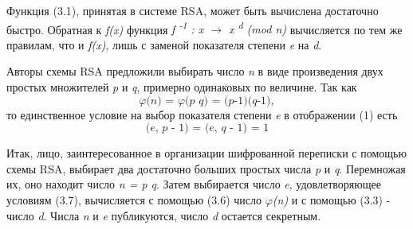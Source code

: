   Функция (3.1), принятая в системе RSA, может быть вычислена достаточно быстро. Обратная к \textit{f(x)} функция 
\textit{f\textsuperscript{ -1} : x {$\rightarrow$} x\textsuperscript{ d} (mod n) } вычисляется по тем же правилам, что и \textit{f(x)}, 
лишь с заменой показателя степени \textit{e} на \textit{d}.
\begin{comment}
  Для вычисления функции (3.1) достаточно знать лишь числа \textit{e} и \textit{n}. Именно они составляют открытый ключ для шифрования. 
А вот для вычисления обратной функции требуется знать число \textit{d}. Казалось бы, ничего не стоит, зная число \textit{n}, разложить 
его на простые сомножители, вычислить затем с помощью известных правил значение \textit{{$\varphi$}(n)} и, наконец, с помощью (3.3) определить 
нужное число \textit{d}. Все шаги этого вычисления могут быть реализованы достаточно быстро, за исключением первого. Именно разложение числа \textit{n} на 
простые множители и составляет наиболее трудоемкую часть вычислений. В теории чисел несмотря на многолетнюю её историю и на очень интенсивные поиски в течение последних 20 лет, 
эффективный алгоритм разложения натуральных чисел на множители так и не найден.
\end{comment}
  Авторы схемы RSA предложили выбирать число \textit{n} в виде произведения двух простых множителей \textit{p} и \textit{q}, примерно одинаковых по 
величине. Так как 
\begin{equation}
 \textit{{$\varphi$}(n) = {$\varphi$}(p q) = (p-1)(q-1)},
\end{equation}
то единственное условие на выбор показателя степени \textit{e} в отображении (1) есть
\begin{equation}
 \textit{(e, p - 1) = (e, q - 1) = 1}
\end{equation}

  Итак, лицо, заинтересованное в организации шифрованной переписки с помощью схемы RSA, выбирает два достаточно больших простых числа \textit{p} и \textit{q}. 
Перемножая их, оно находит число \textit{n = p q}. Затем выбирается число \textit{e}, удовлетворяющее условиям (3.7), вычисляется с помощью (3.6) 
число \textit{{$\varphi$}(n)} и с помощью (3.3) - число \textit{d}. Числа \textit{n} и \textit{e} публикуются, число \textit{d} остается секретным.

